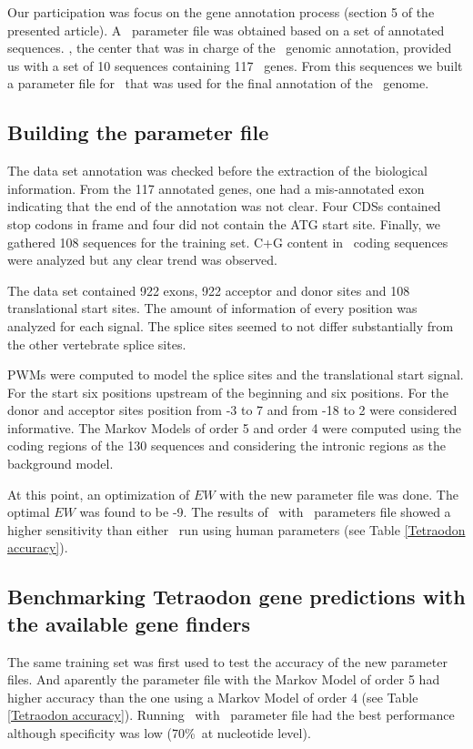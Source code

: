Our participation was focus on the gene annotation process (section 5
of the presented article). A \geneid\ parameter file was obtained
based on a set of annotated sequences. \genos, the center that was in
charge of the \Tetra\ genomic annotation, provided us with a set of 10
sequences containing 117 \Tetra\ genes. From this sequences we
built a parameter file for \geneid\ that was used for the final
annotation of the \Tn\ genome.

\subsection*{Building the parameter file}

The data set annotation was checked before the extraction of the
biological information. From the 117 annotated genes, one had a
mis-annotated exon indicating that the end of the annotation was not
clear. Four CDSs contained stop codons in frame and four did not
contain the ATG start site. Finally, we gathered 108 sequences for the
training set. C+G content in \Tetra\ coding sequences were analyzed
but any clear trend was observed.

The data set contained 922 exons, 922 acceptor and donor sites and 108
translational start sites. The amount of information of every position
was analyzed for each signal. The splice sites seemed to not differ
substantially from the other vertebrate splice sites.

PWMs were computed to model the splice sites and the translational
start signal. For the start six positions upstream of the beginning
and six positions. For the donor and acceptor sites position from -3
to 7 and from -18 to 2 were considered informative.  The Markov Models
of order 5 and order 4 were computed using the coding regions of the
130 sequences and considering the intronic regions as the background
model. 

At this point, an optimization of $EW$ with the new parameter file was
done. The optimal $EW$ was found to be -9. The results of \geneid\
with \Tetra\ parameters file showed a higher sensitivity than either
\geneid\ run using human parameters (see Table \ref{Tetraodon
accuracy}).


\subsection*{Benchmarking Tetraodon gene predictions with the 
available gene finders}


The same training set was first used to test the accuracy of the new
parameter files. And aparently the parameter file with the Markov
Model of order 5 had higher accuracy than the one using a Markov Model
of order 4 (see Table \ref{Tetraodon accuracy}).  Running
\geneid\ with  \Tetra\ parameter file had the best performance
although specificity was low (70\%\ at nucleotide level).

